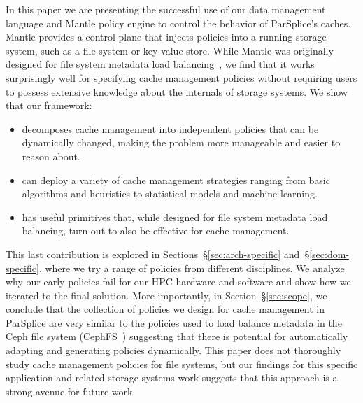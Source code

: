 
In this paper we are presenting the successful use of our data management
language and Mantle policy engine to control the behavior of ParSplice's
caches. Mantle provides a control plane that injects policies into a running
storage system, such as a file system or key-value store. While Mantle was
originally designed for file system metadata load
balancing~\cite{sevilla:sc15-mantle}, we find that it works surprisingly well
for specifying cache management policies without requiring users to possess
extensive knowledge about the internals of storage systems. We show that our
framework:

\begin{itemize}

  \item decomposes cache management into independent policies that can be
  dynamically changed, making the problem more manageable and easier to reason
  about.

  \item can deploy a variety of cache management strategies ranging from basic
  algorithms and heuristics to statistical models and machine learning.

  \item has useful primitives that, while designed for file system metadata
  load balancing, turn out to also be effective for cache management. 

\end{itemize}


This last contribution is explored in Sections~\S\ref{sec:arch-specific}
and~\S\ref{sec:dom-specific}, where we try a range of policies from different
disciplines. We analyze why our early policies fail for our HPC hardware and
software and show how we iterated to the final solution.  More importantly, in
Section~\S\ref{sec:scope}, we conclude that the collection of policies we
design for cache management in ParSplice are very similar to the policies used
to load balance metadata in the Ceph file system
(CephFS~\cite{weil:osdi2006-ceph}) suggesting that there is potential for
automatically adapting and generating policies dynamically. This paper does not
thoroughly study cache management policies for file systems, but our findings
for this specific application and related storage systems work suggests that
this approach is a strong avenue for future work.


